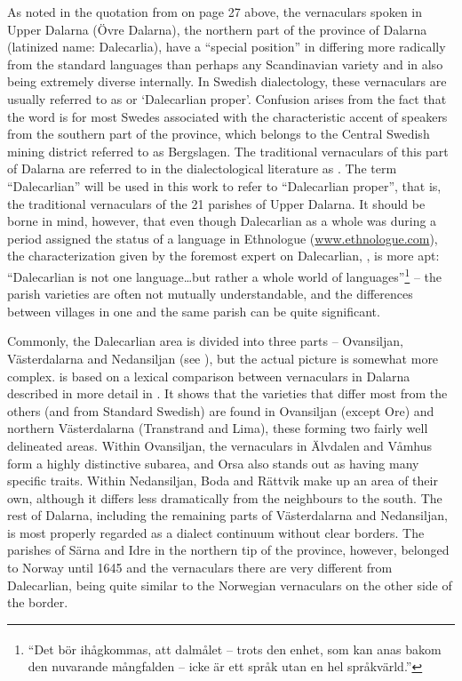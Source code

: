 As noted in the quotation from \citet{Wessén1966} on page 27 above, the vernaculars spoken in Upper Dalarna (Övre Dalarna), the northern part of the province of Dalarna (latinized name: Dalecarlia), have a “special position” in differing more radically from the standard languages than perhaps any Scandinavian variety and in also being extremely diverse internally. In Swedish dialectology, these vernaculars are usually referred to as  or ‘Dalecarlian proper’. Confusion arises from the fact that the word  is for most Swedes associated with the characteristic accent of speakers from the southern part of the province, which belongs to the Central Swedish mining district referred to as Bergslagen. The traditional vernaculars of this part of Dalarna are referred to in the dialectological literature as . The term “Dalecarlian” will be used in this work to refer to “Dalecarlian proper”, that is, the traditional vernaculars of the 21 parishes of Upper Dalarna. It should be borne in mind, however, that even though Dalecarlian as a whole was during a period  assigned the status of a language in Ethnologue (\href{http://www.ethnologue.com}{{www.ethnologue.com}}), the characterization given by the foremost expert on Dalecarlian, \citet[257]{Levander1928}, is more apt: “Dalecarlian is not one language…but rather a whole world of languages”\footnote{\textsuperscript{ }“Det bör ihågkommas, att dalmålet – trots den enhet, som kan anas bakom den nuvarande mångfalden – icke är ett språk utan en hel språkvärld.”} – the parish varieties are often not mutually understandable, and the differences between villages in one and the same parish can be quite significant. 

Commonly, the Dalecarlian area is divided into three parts – Ovansiljan, Västerdalarna and Nedansiljan (see ), but the actual picture is somewhat more complex.  is based on a lexical comparison between vernaculars in Dalarna described in more detail in \citet{Dahl2005}. It shows that the varieties that differ most from the others (and from Standard Swedish) are found in Ovansiljan (except Ore) and northern Västerdalarna (Transtrand and Lima), these forming two fairly well delineated areas. Within Ovansiljan, the vernaculars in Älvdalen and Våmhus form a highly distinctive subarea, and Orsa also stands out as having many specific traits. Within Nedansiljan, Boda and Rättvik make up an area of their own, although it differs less dramatically from the neighbours to the south. The rest of Dalarna, including the remaining parts of Västerdalarna and Nedansiljan, is most properly regarded as a dialect continuum without clear borders. The parishes of Särna and Idre in the northern tip of the province, however, belonged to Norway until 1645 and the vernaculars there are very different from Dalecarlian, being quite similar to the Norwegian vernaculars on the other side of the border. 

